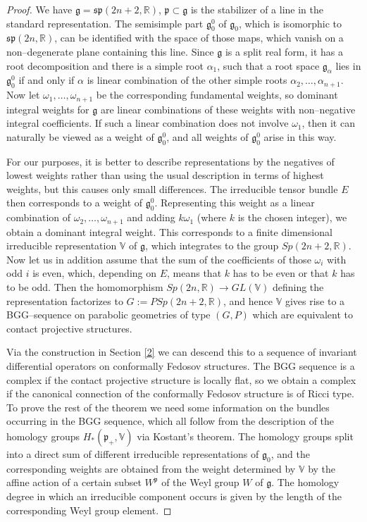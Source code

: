 \documentclass[12pt,a4paper]{amsart}
\def\frak{\mathfrak}
\def\Bbb{\mathbb}
\newcommand{\al}{\alpha}
\newcommand{\om}{\omega}
\newcounter{theorem}
\numberwithin{theorem}{section}
\theoremstyle{definition}
\theoremstyle{remark}
\begin{document}
\begin{proof}
We have $\frak g=\mathfrak{sp}(2n+2,\Bbb R)$, $\frak p\subset\frak g$
is the stabilizer of a line in the standard representation. The
semisimple part $\frak g_0^0$ of $\frak g_0$, which is isomorphic to
$\frak {sp}(2n,\Bbb R)$, can be identified with the space of those
maps, which vanish on a non--degenerate plane containing this
line. Since $\frak g$ is a split real form, it has a root
decomposition and there is a simple root $\al_1$, such that a root
space $\frak g_\al$ lies in $\frak g_0^0$ if and only if $\al$ is
linear combination of the other simple roots
$\al_2,\dots,\al_{n+1}$. Now let $\om_1,\dots,\om_{n+1}$ be the
corresponding fundamental weights, so dominant integral weights for
$\frak g$ are linear combinations of these weights with non--negative
integral coefficients. If such a linear combination does not involve
$\om_1$, then it can naturally be viewed as a weight of $\frak g_0^0$,
and all weights of $\frak g_0^0$ arise in this way.

For our purposes, it is better to describe representations by the
negatives of lowest weights rather than using the usual description in
terms of highest weights, but this causes only small differences. The
irreducible tensor bundle $E$ then corresponds to a weight of $\frak
g_0^0$. Representing this weight as a linear combination of
$\om_2,\dots,\om_{n+1}$ and adding $k\om_1$ (where $k$ is the chosen
integer), we obtain a dominant integral weight. This corresponds to a
finite dimensional irreducible representation $\Bbb V$ of $\frak g$,
which integrates to the group $Sp(2n+2,\Bbb R)$. Now let us in
addition assume that the sum of the coefficients of those $\om_i$ with
odd $i$ is even, which, depending on $E$, means that $k$ has to be even
or that $k$ has to be odd. Then the homomorphism $Sp(2n,\Bbb R)\to
GL(\Bbb V)$ defining the representation factorizes to
$G:=PSp(2n+2,\Bbb R)$, and hence $\Bbb V$ gives rise to a
BGG--sequence on parabolic geometries of type $(G,P)$ which are
equivalent to contact projective structures.

Via the construction in Section \ref{2} we can descend this to a
sequence of invariant differential operators on conformally Fedosov
structures. The BGG sequence is a complex if the contact projective
structure is locally flat, so we obtain a complex if the canonical
connection of the conformally Fedosov structure is of Ricci type. To
prove the rest of the theorem we need some information on the bundles
occurring in the BGG sequence, which all follow from the description
of the homology groups $H_*(\frak p_+,\Bbb V)$ via Kostant's
theorem. The homology groups split into a direct sum of different
irreducible representations of $\frak g_0$, and the corresponding
weights are obtained from the weight determined by $\Bbb V$ by the
affine action of a certain subset $W^{\frak p}$ of the Weyl group $W$
of $\frak g$. The homology degree in which an irreducible component
occurs is given by the length of the corresponding Weyl group element.


\end{proof}
\end{document}
